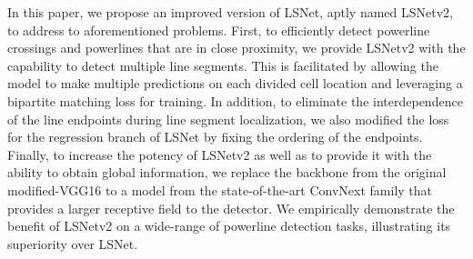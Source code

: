 \documentclass[journal]{IEEEtran}
\begin{document}
In this paper, we propose an improved version of LSNet, aptly named LSNetv2, to address to aforementioned problems. First, to efficiently detect powerline crossings and powerlines that are in close proximity, we provide LSNetv2 with the capability to detect multiple line segments. This is facilitated by allowing the model to make multiple predictions on each divided cell location and leveraging a bipartite matching loss for training. In addition, to eliminate the interdependence of the line endpoints during line segment localization, we also modified the loss for the regression branch of LSNet by fixing the ordering of the endpoints. Finally, to increase the potency of LSNetv2 as well as to provide it with the ability to obtain global information, we replace the backbone from the original modified-VGG16 \cite{vgg} to a model from the state-of-the-art ConvNext family \cite{convnext} that provides a larger receptive field to the detector. We empirically demonstrate the benefit of LSNetv2 on a wide-range of powerline detection tasks, illustrating its superiority over LSNet.



%
%

\end{document}
